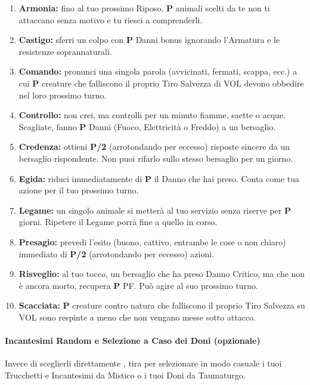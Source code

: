\documentclass[itdr]{subfiles}
\begin{document}
\begin{enumerate}
	\item \textbf{Armonia:} fino al tuo prossimo Riposo, \textbf{P} animali scelti da te non ti attaccano senza motivo e tu riesci a comprenderli.
	\item \textbf{Castigo:} sferri un colpo con \textbf{P} Danni bonus ignorando l’Armatura e le resistenze soprannaturali.
	\item \textbf{Comando:} pronunci una singola parola (avvicinati, fermati, scappa, ecc.) a cui \textbf{P} creature che falliscono il proprio Tiro Salvezza di VOL devono obbedire nel loro prossimo turno.
	\item \textbf{Controllo:} non crei, ma controlli per un minuto fiamme, saette o acque. Scagliate, fanno \textbf{P} Danni (Fuoco, Elettricità o Freddo) a un bersaglio.
	\item \textbf{Credenza:} ottieni \textbf{P/2} (arrotondando per eccesso) risposte sincere da un bersaglio rispondente. Non puoi rifarlo sullo stesso bersaglio per un giorno.
	\item \textbf{Egida:} riduci immediatamente di \textbf{P} il Danno che hai preso. Conta come tua azione per il tuo prossimo turno.
	\item \textbf{Legame:} un singolo animale si metterà al tuo servizio senza riserve per \textbf{P} giorni. Ripetere il Legame porrà fine a quello in corso.
	\item \textbf{Presagio:} prevedi l’esito (buono, cattivo, entrambe le cose o non chiaro) immediato di \textbf{P/2} (arrotondando per eccesso) azioni.
	\item \textbf{Risveglio:} al tuo tocco, un bersaglio che ha preso Danno \mbox{Critico}, ma che non è ancora morto, recupera \textbf{P} PF. Può agire al suo prossimo turno.	
	\item \textbf{Scacciata:} \textbf{P} creature contro natura che falliscono il proprio Tiro Salvezza su VOL sono respinte a meno che non vengano messe sotto attacco.
\end{enumerate}

\break

\vfill
{}
\begin{dbox}
	\paragraph{Incantesimi Random e Selezione a Caso dei Doni (opzionale)}
	 Invece di \mbox{sceglierli} direttamente , tira per selezionare in modo casuale i tuoi Trucchetti e Incantesimi da Mistico o i tuoi Doni da Taumaturgo.
\end{dbox}
\end{document}
